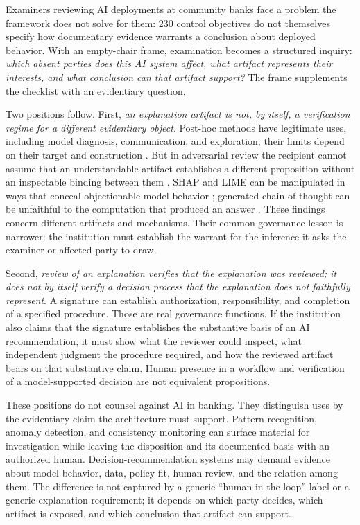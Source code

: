 Examiners reviewing AI deployments at community banks face a problem the framework does not solve for them: 230 control objectives do not themselves specify how documentary evidence warrants a conclusion about deployed behavior. With an empty-chair frame, examination becomes a structured inquiry: \emph{which absent parties does this AI system affect, what artifact represents their interests, and what conclusion can that artifact support?} The frame supplements the checklist with an evidentiary question.

Two positions follow. First, \emph{an explanation artifact is not, by itself, a verification regime for a different evidentiary object}. Post-hoc methods have legitimate uses, including model diagnosis, communication, and exploration; their limits depend on their target and construction \parencite{oh2024}. But in adversarial review the recipient cannot assume that an understandable artifact establishes a different proposition without an inspectable binding between them \parencite{bordt2022}. SHAP and LIME can be manipulated in ways that conceal objectionable model behavior \parencite{slack2020}; generated chain-of-thought can be unfaithful to the computation that produced an answer \parencite{lanham2023,turpin2023}. These findings concern different artifacts and mechanisms. Their common governance lesson is narrower: the institution must establish the warrant for the inference it asks the examiner or affected party to draw.

Second, \emph{review of an explanation verifies that the explanation was reviewed; it does not by itself verify a decision process that the explanation does not faithfully represent}. A signature can establish authorization, responsibility, and completion of a specified procedure. Those are real governance functions. If the institution also claims that the signature establishes the substantive basis of an AI recommendation, it must show what the reviewer could inspect, what independent judgment the procedure required, and how the reviewed artifact bears on that substantive claim. Human presence in a workflow and verification of a model-supported decision are not equivalent propositions.

These positions do not counsel against AI in banking. They distinguish uses by the evidentiary claim the architecture must support. Pattern recognition, anomaly detection, and consistency monitoring can surface material for investigation while leaving the disposition and its documented basis with an authorized human. Decision-recommendation systems may demand evidence about model behavior, data, policy fit, human review, and the relation among them. The difference is not captured by a generic ``human in the loop'' label or a generic explanation requirement; it depends on which party decides, which artifact is exposed, and which conclusion that artifact can support.

